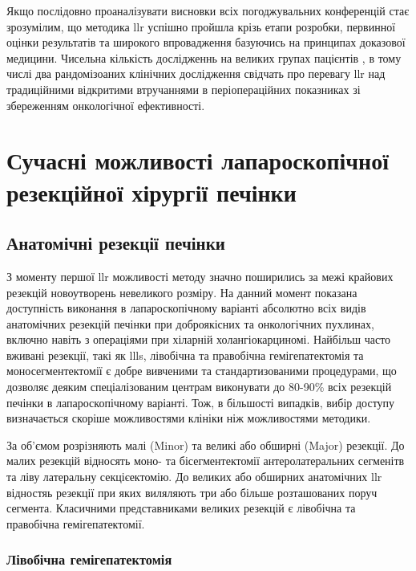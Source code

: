 \begin{refsection}
Якщо послідовно проаналізувати висновки всіх погоджувальних конференцій стає зрозумілим, що методика \acrshort{llr} успішно пройшла крізь етапи розробки, первинної оцінки результатів та широкого впровадження базуючись на принципах доказової медицини. Чисельна кількість дослідженнь на великих групах пацієнтів \cite{Ciria2016b, Takahara2016, Berardi2017}, в тому числі два рандомізоаних клінічних дослідження \cite{Fretland2018b, Robles-Campos2019} свідчать про перевагу \acrshort{llr} над традиційними відкритими втручаннями в періопераційних показниках зі збереженням онкологічної ефективності. 

\section[Сучасні можливості]{Сучасні можливості лапароскопічної резекційної хірургії печінки}

\subsection{Анатомічні резекції печінки}
З моменту першої \acrshort{llr} можливості методу значно поширились за межі крайових резекцій новоутворень невеликого розміру. На данний момент показана доступність виконання в лапароскопічному варіанті абсолютно всіх видів анатомічних резекцій печінки при доброякісних та онкологічних пухлинах, включно навіть з операціями при хіларній холангіокарциномі. Найбільш часто вживані резекції, такі як \acrshort{llls}, лівобічна та правобічна гемігепатектомія та моносегментектомії є добре вивченими та стандартизованими процедурами, що дозволяє деяким спеціалізованим центрам \cite{Garbarino2019} виконувати до 80-90\% всіх резекцій печінки в лапароскопічному варіанті. Тож, в більшості випадків, вибір доступу визначається скоріше можливостями клініки ніж можливостями методики. 

За об'ємом розрізняють малі (Minor) та великі або обширні (Major) резекції. До малих резекцій відносять моно- та бісегментектомії антеролатеральних сегменітв та ліву латеральну секцієектомію. До великих або обширних анатомічних \acrshort{llr} відностяь резекції при яких виляляють три або більше розташованих поруч сегмента. Класичними представниками великих резекцій є лівобічна та правобічна гемігепатектомії.

\subsubsection{Лівобічна гемігепатектомія}


\end{refsection}
